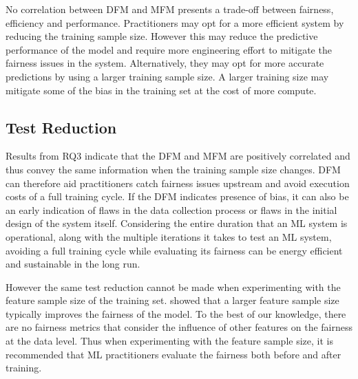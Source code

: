 \documentclass[conference,review,anonymous]{IEEEtran}
\begin{document}
No correlation between DFM and MFM presents a trade-off between
fairness, efficiency and performance. Practitioners may opt for a more
efficient system by reducing the training sample size. However this
may reduce the predictive performance of the model and require more
engineering effort to mitigate the fairness issues in the system.
Alternatively, they may opt for more accurate predictions by using a
larger training sample size. A larger training size may mitigate some
of the bias in the training set at the cost of more compute.

\subsection{Test Reduction}\label{sec:discuss-test-red}

Results from RQ3 indicate that the DFM and MFM are positively
correlated and thus convey the same information when the training
sample size changes. DFM can therefore aid practitioners catch
fairness issues upstream and avoid execution costs of a full training
cycle. If the DFM indicates presence of bias, it can also be an early
indication of flaws in the data collection process or flaws in the
initial design of the system itself. Considering the entire duration
that an ML system is operational, along with the multiple iterations
it takes to test an ML system, avoiding a full training cycle while
evaluating its fairness can be energy efficient and sustainable in the
long run.

However the same test reduction cannot be made when experimenting with
the feature sample size of the training
set. \cite{zhang2021ignorance} showed that a larger feature sample
size typically improves the fairness of the model. To the best of our
knowledge, there are no fairness metrics that consider the influence
of other features on the fairness at the data level. Thus when
experimenting with the feature sample size, it is recommended that ML
practitioners evaluate the fairness both before and after training.


\end{document}
